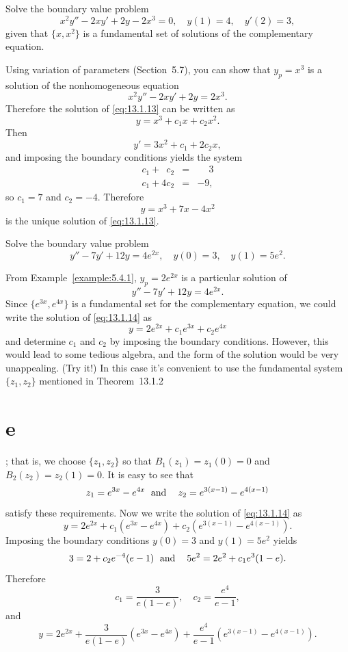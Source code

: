 \setcounter{example}{3}
\setcounter{equation}{12}
\begin{example}
  \label{example:13.1.4} \rm Solve the boundary value problem
  \begin{equation}
    \label{eq:13.1.13}x^{2}y''-2xy'+2y-2x^{3}=0,\quad y(1)=4,\quad y'(2)=3,
  \end{equation}
  given that $\{x,x^{2}\}$ is a fundamental set of solutions of the complementary equation. \end{example}
\begin{examplesolution}
\solution Using variation of parameters (Section~5.7), you can show that $y_{p}=x^{3}$ is a solution
of the nonhomogeneous equation
\[
  x^{2}y''-2xy'+2y=2x^{3}.
\]
Therefore the solution of \eqref{eq:13.1.13} can be written as
\[
  y=x^{3}+c_{1}x+c_{2}x^{2}.
\]
Then
\[
  y'=3x^{2}+c_{1}+2c_{2}x,
\]
and imposing the boundary conditions yields the system
\begin{eqnarray*}
  c_{1}+\phantom{4}c_{2} & = & \phantom{-}3 \\
  c_{1}+4c_{2}           & = & -9,
\end{eqnarray*}
so $c_{1}=7$ and $c_{2}=-4$. Therefore
\[
  y=x^{3}+7x-4x^{2}
\]
is the unique solution of \eqref{eq:13.1.13}.
\end{examplesolution}

\setcounter{example}{4}
\begin{example}
  \label{example:13.1.5} \rm Solve the boundary value problem
  \[
    y''-7y'+12y=4e^{2x},\quad y(0)=3,\quad y(1)=5e^{2}.
  \]
\end{example}
\setcounter{equation}{13}
\begin{examplesolution}
\solution From Example~\ref{example:5.4.1}, $y_{p}=2e^{2x}$ is a particular solution of
\begin{equation}
  \label{eq:13.1.14}y''-7y'+12y=4e^{2x}.
\end{equation}
Since $\{e^{3x},e^{4x}\}$ is a fundamental set for the complementary equation, we could write the
solution of \eqref{eq:13.1.14} as
\[
  y=2e^{2x}+c_{1}e^{3x}+c_{2}e^{4x}
\]
and determine $c_{1}$ and $c_{2}$ by imposing the boundary conditions. However, this would lead to
some tedious algebra, and the form of the solution would be very unappealing. (Try it!) In this case
it's convenient to use the fundamental system $\{z_{1},z_{2}\}$ mentioned in
Theorem~13.1.2\part{e}; that is, we choose $\{z_{1},z_{2}\}$ so that
$B_{1}(z_{1})=z_{1}(0)=0$ and $B_{2}(z_{2})=z_{2}(1)=0$. It is easy to see that
\[
  z_{1}=e^{3x}-e^{4x}\text{\; and\; \; }z_{2}=e^{3(x-1)}-e^{4(x-1)}
\]
satisfy these requirements. Now we write the solution of \eqref{eq:13.1.14} as
\[
  y=2e^{2x}+c_{1}\left(e^{3x}-e^{4x}\right)+c_{2}\left(e^{3(x-1)}-e^{4(x-1)}\right).
\]
Imposing the boundary conditions $y(0)=3$ and $y(1)=5e^{2}$ yields
\[
  3=2+c_{2}e^{-4}(e-1)\text{\; and\; \; }5e^{2}=2e^{2}+c_{1}e^{3}(1-e).
\]
Therefore
\[
  c_{1}=\frac{3}{e(1-e)},\quad c_{2}=\frac{e^{4}}{e-1},
\]
and
\[
  y=2e^{2x}+\frac{3}{e(1-e)}(e^{3x}-e^{4x})+ \frac{e^{4}}{e-1}(e^{3(x-1)}-e^{4(x-1)}).
\]
\end{examplesolution}

